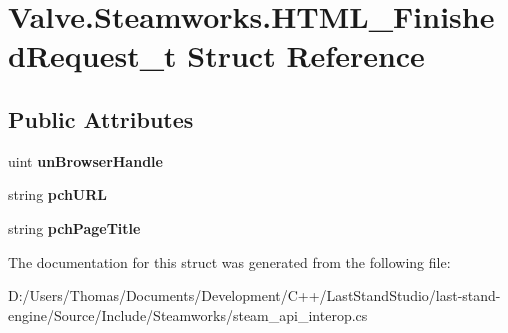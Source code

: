 \hypertarget{structValve_1_1Steamworks_1_1HTML__FinishedRequest__t}{}\section{Valve.\+Steamworks.\+H\+T\+M\+L\+\_\+\+Finished\+Request\+\_\+t Struct Reference}
\label{structValve_1_1Steamworks_1_1HTML__FinishedRequest__t}
\subsection*{Public Attributes}
\begin{DoxyCompactItemize}
\item 
\hypertarget{structValve_1_1Steamworks_1_1HTML__FinishedRequest__t_afbf9091ada562ffa697cdd38babf660f}{}uint {\bfseries un\+Browser\+Handle}\label{structValve_1_1Steamworks_1_1HTML__FinishedRequest__t_afbf9091ada562ffa697cdd38babf660f}

\item 
\hypertarget{structValve_1_1Steamworks_1_1HTML__FinishedRequest__t_a6fc96e8b5e927ae8b630f39e415528cd}{}string {\bfseries pch\+U\+R\+L}\label{structValve_1_1Steamworks_1_1HTML__FinishedRequest__t_a6fc96e8b5e927ae8b630f39e415528cd}

\item 
\hypertarget{structValve_1_1Steamworks_1_1HTML__FinishedRequest__t_a966c548d177d0ac17ca4198d505bda82}{}string {\bfseries pch\+Page\+Title}\label{structValve_1_1Steamworks_1_1HTML__FinishedRequest__t_a966c548d177d0ac17ca4198d505bda82}

\end{DoxyCompactItemize}


The documentation for this struct was generated from the following file\+:\begin{DoxyCompactItemize}
\item 
D\+:/\+Users/\+Thomas/\+Documents/\+Development/\+C++/\+Last\+Stand\+Studio/last-\/stand-\/engine/\+Source/\+Include/\+Steamworks/steam\+\_\+api\+\_\+interop.\+cs\end{DoxyCompactItemize}
